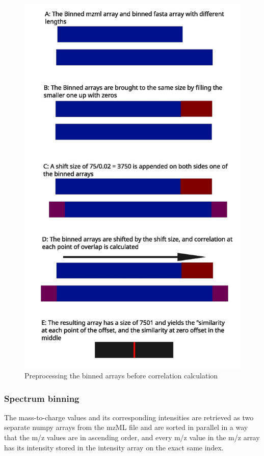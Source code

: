 \documentclass[11pt]{article}
\begin{document}
\begin{figure}
\includegraphics[width=\linewidth]{figs/crosscorr.jpg} 
\caption{Preprocessing the binned arrays before correlation calculation}
\label{fig:corr}
\end{figure}

\subsubsection{Spectrum binning}
The mass-to-charge values and its corresponding intensities are retrieved as two separate numpy arrays from the mzML file and are sorted in parallel in a way that the m/z values are in ascending order, and every m/z value in the m/z array has its intensity stored in the intensity array on the exact same index.
\end{document}
